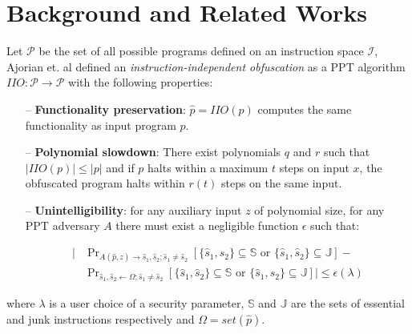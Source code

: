 \section{Background and Related Works}
\label{sec:background}

Let $\mathcal{P}$ be the set of all possible programs defined on an instruction space $\mathcal{I}$, Ajorian et. al defined an \textit{instruction-independent obfuscation} \cite{ajorianiio} as a PPT algorithm $IIO:\mathcal{P}\rightarrow \mathcal{P}$  with the following properties:

\begin{itemize}
	\item[--] \textbf{Functionality preservation}: $\hat p = IIO(p)$ computes the same functionality as input program $p$.
	\item[--] \textbf{Polynomial slowdown}: There exist polynomials $q$ and $r$ such that $|IIO(p)| \leq |p|$ and if $p$ halts within a maximum $t$ steps on input $x$, the obfuscated program halts within $r(t)$ steps on the same input.
	\item[--] \textbf{Unintelligibility}: for any auxiliary input $z$ of polynomial size, for any PPT adversary $A$ there must exist a negligible function $\epsilon$ such that:

	\begin{equation}
	\label{eq:s_unintelligibility}
	\begin{split}
		\big| & \Pr\nolimits_{A(\hat p, z)\rightarrow \hat s_1, \hat s_2; \hat s_1 \neq \hat s_2}[\{\hat s_1, \hat s_2\} \subseteq \mathbb{S} \text{ or } \{\hat s_1, \hat s_2\} \subseteq \mathbb{J}] - \\ 
      		& \Pr\nolimits_{\hat s_1, \hat s_2 \leftarrow \Omega ; \hat s_1 \neq \hat s_2}[\{\hat s_1, \hat s_2\} \subseteq \mathbb{S} \text{ or } \{\hat s_1, \hat s_2\} \subseteq \mathbb{J}] \big| \leq \epsilon(\lambda)
	\end{split}
	\end{equation}
\end{itemize}
where $\lambda$ is a user choice of a security parameter, $\mathbb{S}$ and $\mathbb{J}$ are the sets of essential and junk instructions respectively and $\Omega=set(\hat p)$.